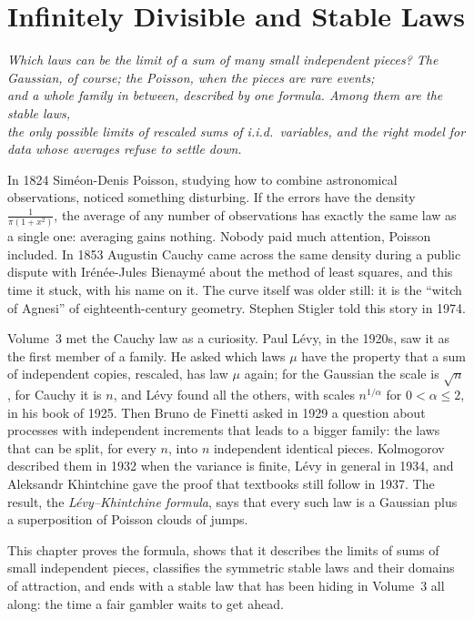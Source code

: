 \chapter{Infinitely Divisible and Stable Laws}
\begin{center}\itshape
Which laws can be the limit of a sum of many small independent pieces? The Gaussian, of course; the Poisson, when the pieces are rare events;\\
and a whole family in between, described by one formula. Among them are the stable laws,\\
the only possible limits of rescaled sums of i.i.d.\ variables, and the right model for data whose averages refuse to settle down.
\end{center}

In 1824 Sim\'eon-Denis Poisson, studying how to combine astronomical observations, noticed something disturbing. If the errors have the density
$\frac1{\pi(1+x^2)}$, the average of any number of observations has exactly the same law as a single one: averaging gains nothing. Nobody paid much
attention, Poisson included. In 1853 Augustin Cauchy came across the same density during a public dispute with Ir\'en\'ee-Jules Bienaym\'e about the method of
least squares, and this time it stuck, with his name on it. The curve itself was older still: it is the ``witch of Agnesi'' of eighteenth-century
geometry. Stephen Stigler told this story in 1974.

Volume~3 met the Cauchy law as a curiosity. Paul L\'evy, in the 1920s, saw it as the first member of a family. He asked which laws $\mu$ have the property
that a sum of independent copies, rescaled, has law $\mu$ again; for the Gaussian the scale is $\sqrt n$, for Cauchy it is $n$, and L\'evy found all the
others, with scales $n^{1/\alpha}$ for $0<\alpha\le2$, in his book of 1925. Then Bruno de Finetti asked in 1929 a question about processes with
independent increments that leads to a bigger family: the laws that can be split, for every $n$, into $n$ independent identical pieces. Kolmogorov
described them in 1932 when the variance is finite, L\'evy in general in 1934, and Aleksandr Khintchine gave the proof that textbooks still follow in 1937.
The result, the \emph{L\'evy--Khintchine formula}, says that every such law is a Gaussian plus a superposition of Poisson clouds of jumps.

This chapter proves the formula, shows that it describes the limits of sums of small independent pieces, classifies the symmetric stable laws and
their domains of attraction, and ends with a stable law that has been hiding in Volume~3 all along: the time a fair gambler waits to get ahead.

